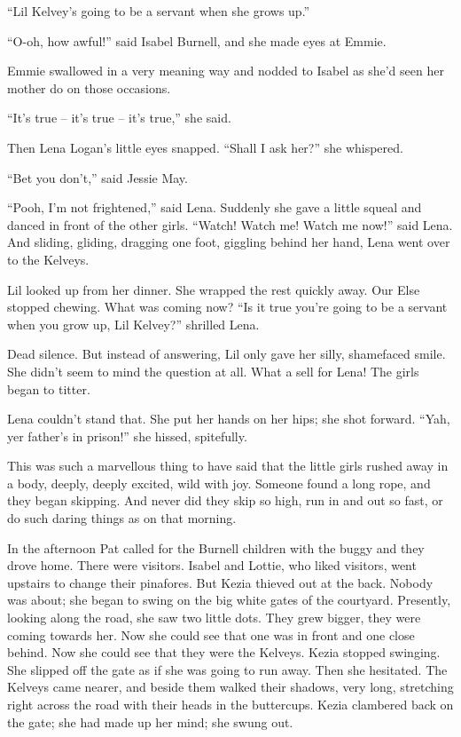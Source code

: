 \documentclass[10pt,a4paper]{article}
\begin{document}
“Lil Kelvey’s going to be a servant when she grows up.”

“O-oh, how awful!” said Isabel Burnell, and she made eyes at Emmie.

Emmie swallowed in a very meaning way and nodded to Isabel as she’d seen her mother do on those occasions.

“It’s true – it’s true – it’s true,” she said.

Then Lena Logan’s little eyes snapped. “Shall I ask her?” she whispered.

“Bet you don’t,” said Jessie May.

“Pooh, I’m not frightened,” said Lena. Suddenly she gave a little squeal and danced in front of the other girls. “Watch! Watch me! Watch me now!” said Lena. And sliding, gliding, dragging one foot, giggling behind her hand, Lena went over to the Kelveys.

Lil looked up from her dinner. She wrapped the rest quickly away. Our Else stopped chewing. What was coming now?
“Is it true you’re going to be a servant when you grow up, Lil Kelvey?” shrilled Lena.

Dead silence. But instead of answering, Lil only gave her silly, shamefaced smile. She didn’t seem to mind the question at all. What a sell for Lena! The girls began to titter.

Lena couldn’t stand that. She put her hands on her hips; she shot forward. “Yah, yer father’s in prison!” she hissed, spitefully.

This was such a marvellous thing to have said that the little girls rushed away in a body, deeply, deeply excited, wild with joy. Someone found a long rope, and they began skipping. And never did they skip so high, run in and out so fast, or do such daring things as on that morning.

In the afternoon Pat called for the Burnell children with the buggy and they drove home. There were visitors. Isabel and Lottie, who liked visitors, went upstairs to change their pinafores. But Kezia thieved out at the back. Nobody was about; she began to swing on the big white gates of the courtyard. Presently, looking along the road, she saw two little dots. They grew bigger, they were coming towards her. Now she could see that one was in front and one close behind. Now she could see that they were the Kelveys. Kezia stopped swinging. She slipped off the gate as if she was going to run away. Then she hesitated. The Kelveys came nearer, and beside them walked their shadows, very long, stretching right across the road with their heads in the buttercups. Kezia clambered back on the gate; she had made up her mind; she swung out.
\end{document}
